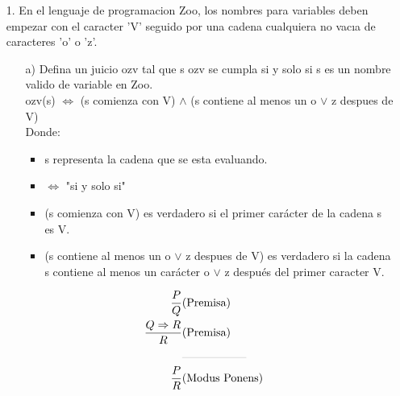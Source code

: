 \documentclass{article}
\begin{document}
    \begin{itemize}
        \item[1.] En el lenguaje de programacion Zoo, los nombres para variables deben empezar con el caracter ’V’ seguido por una cadena cualquiera no vacıa de caracteres ’o’ o ’z’.
            \begin{itemize}
                \item[a)]Defina un juicio ozv tal que s ozv se cumpla si y solo si s es un nombre valido de variable en Zoo.\\
                ozv(s) $\Leftrightarrow$ (s comienza con V) $\land$ (s contiene al menos un o $\lor$ z despues de V)\\
                Donde:\\
                \begin{itemize}
                    \item s representa la cadena que se esta evaluando.
                    \item $\Leftrightarrow$ "si y solo si"
                    \item (s comienza con V) es verdadero si el primer carácter de la cadena s es V.
                    \item (s contiene al menos un o $\lor$ z despues de V) es verdadero si la cadena s contiene al menos un carácter o $\lor$ z después del primer caracter V.
                \end{itemize}

                \begin{align*}
                    \frac{P}{Q} & \text{(Premisa)} \\
                    \frac{Q \Rightarrow R}{R} & \text{(Premisa)}\\
                    &\rule{2cm}{0.1pt}&\\
                    \frac{P}{R}&\text{(Modus Ponens)}
                \end{align*}


\end{itemize}
\end{itemize}
\end{document}
